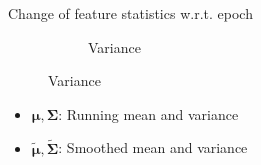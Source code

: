 \begin{frame}{Change of feature statistics w.r.t. epoch}
\begin{figure}[h]
\begin{subfigure}{0.48\textwidth}
			\caption{Variance}
		\end{subfigure}
	\end{figure}
	\begin{itemize}
		\item ${\bm{\mu}, \bm{\Sigma}}$: Running mean and variance
		\item ${\bm{\tilde{\mu}}, \bm{\tilde{\Sigma}}}$: Smoothed mean and variance
	\end{itemize}
\end{frame}

